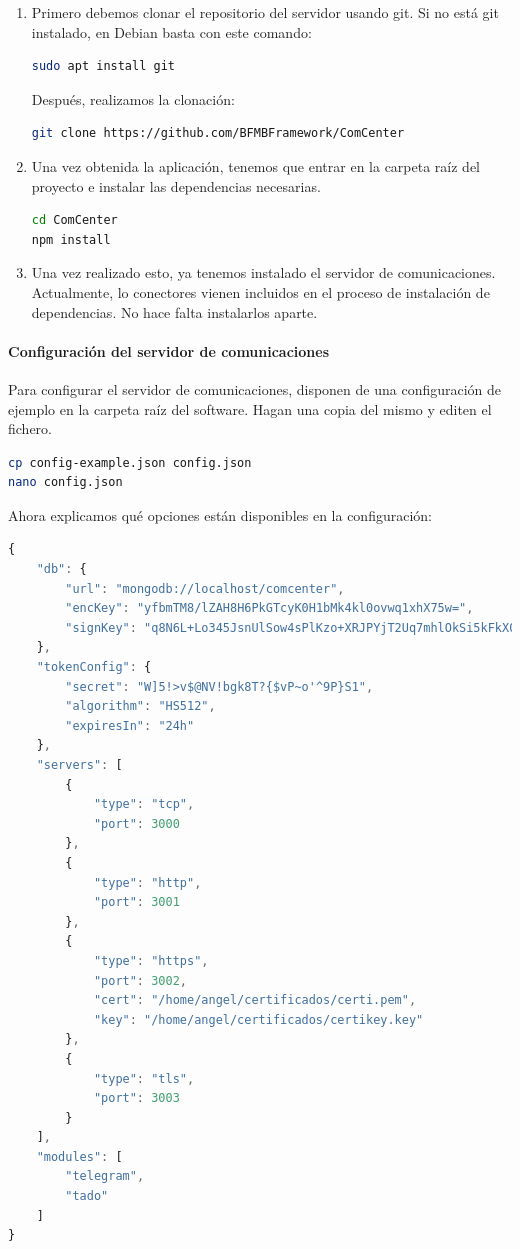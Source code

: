 \documentclass[spanish,12pt, a4paper, twoside]{paper}
\begin{document}
\begin{enumerate}
\item Primero debemos clonar el repositorio del servidor usando git. Si no está git instalado, en Debian basta con este comando:
\begin{lstlisting}[language=sh]
sudo apt install git
\end{lstlisting}

Después, realizamos la clonación:
\begin{lstlisting}[language=sh]
git clone https://github.com/BFMBFramework/ComCenter
\end{lstlisting}

\item Una vez obtenida la aplicación, tenemos que entrar en la carpeta raíz del proyecto e instalar las dependencias necesarias.
\begin{lstlisting}[language=sh]
cd ComCenter
npm install
\end{lstlisting}

\item Una vez realizado esto, ya tenemos instalado el servidor de comunicaciones. Actualmente, lo conectores vienen incluidos en el proceso de instalación de dependencias. No hace falta instalarlos aparte.
\end{enumerate}

\paragraph{Configuración del servidor de comunicaciones}

Para configurar el servidor de comunicaciones, disponen de una configuración de ejemplo en la carpeta raíz del software. Hagan una copia del mismo y editen el fichero.

\begin{lstlisting}[language=sh]
cp config-example.json config.json
nano config.json
\end{lstlisting}

Ahora explicamos qué opciones están disponibles en la configuración:
\begin{lstlisting}[language=JavaScript]
{
	"db": {
		"url": "mongodb://localhost/comcenter",
		"encKey": "yfbmTM8/lZAH8H6PkGTcyK0H1bMk4kl0ovwq1xhX75w=",
		"signKey": "q8N6L+Lo345JsnUlSow4sPlKzo+XRJPYjT2Uq7mhlOkSi5kFkX0UoIY3etfm4UxtNHaM8xaX2HtkAhV7Gye0KA=="
	},
	"tokenConfig": {
		"secret": "W]5!>v$@NV!bgk8T?{$vP~o'^9P}S1",
		"algorithm": "HS512",
		"expiresIn": "24h"
	},
	"servers": [
		{
			"type": "tcp",
			"port": 3000
		},
		{
			"type": "http",
			"port": 3001
		},
		{
			"type": "https",
			"port": 3002,
			"cert": "/home/angel/certificados/certi.pem",
			"key": "/home/angel/certificados/certikey.key"
		},
		{
			"type": "tls",
			"port": 3003
		}
	],
	"modules": [
		"telegram",
		"tado"
	]
}
\end{lstlisting}
\end{document}
